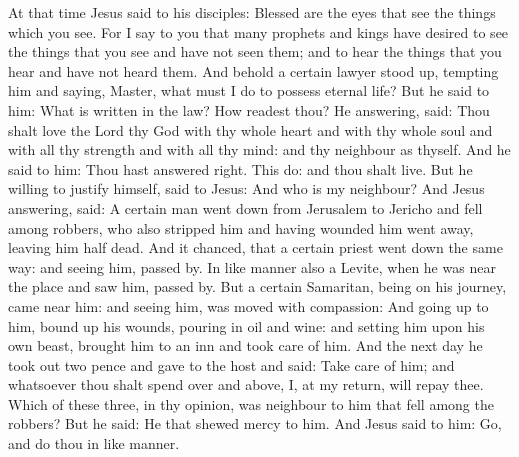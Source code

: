 
At that time Jesus said to his disciples:
Blessed are the eyes that
see the things which you see.
For I say to you that many prophets and kings have desired to see
the things that you see and have not seen them; and to hear the things
that you hear and have not heard them.
And behold a certain lawyer stood up, tempting him and saying,
Master, what must I do to possess eternal life?
But he said to him: What is written in the law? How readest thou?
He answering, said: Thou shalt love the Lord thy God with thy
whole heart and with thy whole soul and with all thy strength and with
all thy mind: and thy neighbour as thyself.
And he said to him: Thou hast answered right. This do: and thou
shalt live.
But he willing to justify himself, said to Jesus: And who is my
neighbour?
And Jesus answering, said: A certain man went down from Jerusalem
to Jericho and fell among robbers, who also stripped him and having
wounded him went away, leaving him half dead.
And it chanced, that a certain priest went down the same way: and
seeing him, passed by.
In like manner also a Levite, when he was near the place and saw
him, passed by.
But a certain Samaritan, being on his journey, came near him: and
seeing him, was moved with compassion:
And going up to him, bound up his wounds, pouring in oil and
wine: and setting him upon his own beast, brought him to an inn and took
care of him.
And the next day he took out two pence and gave to the host and
said: Take care of him; and whatsoever thou shalt spend over and above,
I, at my return, will repay thee.
Which of these three, in thy opinion, was neighbour to him that
fell among the robbers?
But he said: He that shewed mercy to him. And Jesus said to him:
Go, and do thou in like manner.







